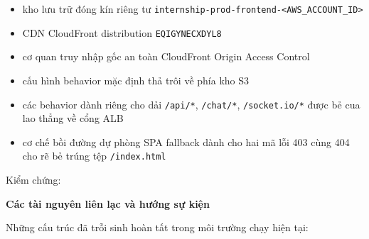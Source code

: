 \begin{itemize}
\tightlist
\item
  kho lưu trữ đóng kín riêng tư
  \texttt{internship-\allowbreak{}prod-\allowbreak{}frontend-\textless{}AWS\_\allowbreak{}ACCOUNT\_\allowbreak{}ID\textgreater{}}
\item
  CDN CloudFront distribution \texttt{EQIGYNECXDYL8}
\item
  cơ quan truy nhập gốc an toàn CloudFront Origin Access Control
\item
  cấu hình behavior mặc định thả trôi về phía kho S3
\item
  các behavior dành riêng cho dải \texttt{/\allowbreak{}api/\allowbreak{}*}, \texttt{/\allowbreak{}chat/\allowbreak{}*},
  \texttt{/\allowbreak{}socket.\allowbreak{}io/\allowbreak{}*} được bẻ cua lao thẳng về cổng ALB
\item
  cơ chế bồi đường dự phòng SPA fallback dành cho hai mã lỗi 403 cùng
  404 cho rẽ bẻ trúng tệp \texttt{/\allowbreak{}index.\allowbreak{}html}
\end{itemize}

Kiểm chứng:

\begin{Shaded}
\begin{Highlighting}[]
\OperatorTok{\textless{}}\OperatorTok{\textgreater{}}
\end{Highlighting}
\end{Shaded}

\vspace{0.5em}\noindent\textbf{Các tài nguyên liên lạc và hướng sự
kiện}\par

Những cấu trúc đã trỗi sinh hoàn tất trong môi trường chạy hiện tại:

